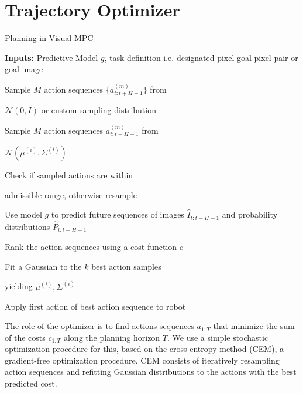 \section{Trajectory Optimizer}

\begin{algorithm}[ht]
\caption{Planning in Visual MPC}
\label{alg:opt}
\begin{algorithmic}[1]
\State \textbf{Inputs:} Predictive Model $g$, task definition i.e. designated-pixel goal pixel pair or goal image

\State \begin{varwidth}[t]{\linewidth}
	Sample $M$ action sequences $\{a^{(m)}_{t:t+H-1}\}$ from \par $\mathcal N(0, I)$ or
	custom sampling distribution
\end{varwidth}
\Else
\State \begin{varwidth}[t]{\linewidth}
	Sample $M$ action sequences ${a^{(m)}_{t:t+H-1}}$ from \par 
	$\mathcal N(\mu^{(i)}, \Sigma^{(i)})$
\end{varwidth}
\EndIf
\State 
\begin{varwidth}[t]{\linewidth}
Check if sampled actions are within \par
admissible range, otherwise resample
\end{varwidth}
\State  \begin{varwidth}[t]{\linewidth}
	Use model $g$ to predict future sequences of images $\hat{I}_{t:t+H-1}$ and probability distributions $\hat{P}_{t:t+H-1}$
\end{varwidth}
\State Rank the action sequences using a cost function $c$
\State  \begin{varwidth}[t]{\linewidth}
	Fit a Gaussian to the $k$ best action samples \par 
	yielding $\mu^{(i)}, \Sigma^{(i)}$
\end{varwidth}
\EndFor
\State Apply first action of best action sequence to robot
\EndFor
\end{algorithmic}
\end{algorithm}


\label{sec:optimizer}
The role of the optimizer is to find actions sequences $a_{1:T}$ that minimize the sum of the costs $c_{1:T}$ along the planning horizon $T$. We use a simple stochastic optimization procedure for this, based on the cross-entropy method (CEM), a gradient-free optimization procedure. CEM consists of iteratively resampling action sequences and refitting Gaussian distributions to the actions with the best predicted cost.

